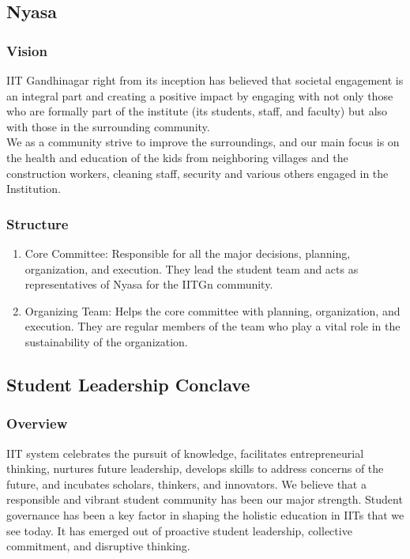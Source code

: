 \documentclass[12pt]{article}
\begin{document}
\subsection{Nyasa}
\subsubsection{Vision}
IIT Gandhinagar right from its inception has believed that societal engagement is an integral part and creating a positive impact by engaging with not only those who are formally part of the institute (its students, staff, and faculty) but also with those in the surrounding community.\\

\noindent We as a community strive to improve the surroundings, and our main focus is on the health and education of the kids from neighboring villages and the construction workers, cleaning staff, security and various others engaged in the Institution.

\subsubsection{Structure}
\begin{enumerate}
    \item Core Committee: Responsible for all the major decisions, planning, organization, and execution. They lead the student team and acts as representatives of Nyasa for the IITGn community.
    \item Organizing Team: Helps the core committee with planning, organization, and execution. They are regular members of the team who play a vital role in the sustainability of the organization.
\end{enumerate}


\subsection{Student Leadership Conclave}
\subsubsection{Overview}
IIT system celebrates the pursuit of knowledge, facilitates entrepreneurial thinking, nurtures future leadership, develops skills to address concerns of the future, and incubates scholars, thinkers, and innovators. We believe that a responsible and vibrant student community has been our major strength. Student governance has been a key factor in shaping the holistic education in IITs that we see today. It has emerged out of proactive student leadership, collective commitment, and disruptive thinking.\\
\end{document}
